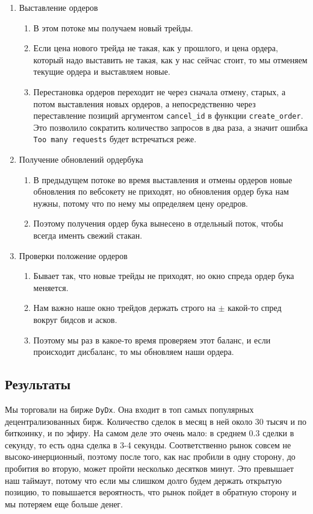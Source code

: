 \begin{enumerate}

\item Выставление ордеров
\begin{enumerate}
    \item В этом потоке мы получаем новый трейды.
    \item Если цена нового трейда не такая, как у прошлого, и цена ордера, который надо выставить не такая, как у нас сейчас стоит, то мы отменяем текущие ордера и выставляем новые.
    \item Перестановка ордеров переходит не через сначала отмену, старых, а потом выставления новых ордеров, а непосредственно через переставление позиций аргументом \texttt{cancel\_id} в функции \texttt{create\_order}. Это позволило сократить количество запросов в два раза, а значит ошибка \texttt{Too many requests} будет встречаться реже.
\end{enumerate}

\item Получение обновлений ордербука
\begin{enumerate}
    \item В предыдущем потоке во время выставления и отмены ордеров новые обновления по вебсокету не приходят, но обновления ордер бука нам нужны, потому что по нему мы определяем цену оредров.
    \item Поэтому получения ордер бука вынесено в отдельный поток, чтобы всегда именть свежий стакан.
\end{enumerate}

\item Проверки положение ордеров
\begin{enumerate}
    \item Бывает так, что новые трейды не приходят, но окно спреда ордер бука меняется.
    \item Нам важно наше окно трейдов держать строго на $\pm$ какой-то спред вокруг бидсов и асков.
    \item Поэтому мы раз в какое-то время проверяем этот баланс, и если происходит дисбаланс, то мы обновляем наши ордера.
\end{enumerate}

\end{enumerate}

\subsection{Результаты}
Мы торговали на бирже \texttt{DyDx}. Она входит в топ самых популярных децентрализованных бирж. Количество сделок в месяц в ней около 30 тысяч и по биткоинку, и по эфиру. На самом деле это очень мало: в среднем $0.3$ сделки в секунду, то есть одна сделка в 3-4 секунды. Соответственно рынок совсем не высоко-инерционный, поэтому после того, как нас пробили в одну сторону, до пробития во вторую, может пройти несколько десятков минут. Это превышает наш таймаут, потому что если мы слишком долго будем держать открытую позицию, то повышается вероятность, что рынок пойдет в обратную сторону и мы потеряем еще больше денег.

